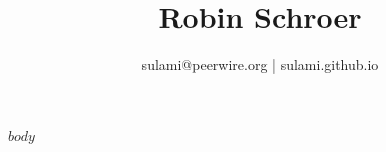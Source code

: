 \documentclass[a4paper,10pt]{scrartcl}
\title{\bfseries Robin Schroer}
\author{sulami@peerwire.org | sulami.github.io}
\date{}
\begin{document}
\maketitle

$body$
\end{document}
